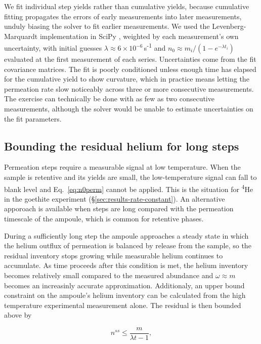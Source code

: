 We fit individual step yields rather than cumulative yields, because cumulative fitting propagates the errors of early measurements into later measurements, unduly biasing the solver to fit earlier measurements. We used the Levenberg-Marquardt implementation in SciPy \citep{virtanen2020}, weighted by each measurement's own uncertainty, with initial guesses $\lambda \approx 6\times10^{-6}$\,s\textsuperscript{-1} and $n_{0} \approx m_{i}/(1-e^{-\lambda t_{i}})$ evaluated at the first measurement of each series. Uncertainties come from the fit covariance matrices. The fit is poorly conditioned unless enough time has elapsed for the cumulative yield to show curvature, which in practice means letting the permeation rate slow noticeably across three or more consecutive measurements. The exercise can technically be done with as few as two consecutive measurements, although the solver would be unable to estimate uncertainties on the fit parameters. 

\subsection{Bounding the residual helium for long steps}\label{sec:bounding}

Permeation steps require a measurable signal at low temperature. When the sample is retentive and its yields are small, the low-temperature signal can fall to blank level and Eq.~\eqref{eq:n0perm} cannot be applied. This is the situation for \textsuperscript{4}He in the goethite experiment (\S\ref{sec:results-rate-constant}). An alternative apporoach is available when steps are long compared with the permeation timescale of the ampoule, which is common for retentive phases.

During a sufficiently long step the ampoule approaches a steady state in which the helium outflux of permeation is balanced by release from the sample, so the residual inventory stops growing while measurable helium continues to accumulate. As time proceeds after this condition is met, the helium inventory becomes relatively small compared to the measured abundance and $\omega \approx m$ becomes an increasinly accurate approximation. Additionaly, an upper bound constraint on the ampoule's helium inventory can be calculated from the high temperature experimental measurement alone. The residual is then bounded above by

\begin{equation}
\label{eq:steadystate}
n^{ss} \leq \frac{m}{\lambda t - 1} ,
\end{equation}

